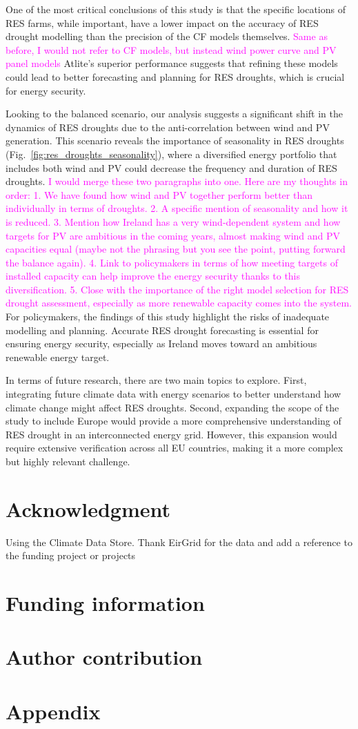 \documentclass[a4paper, 11pt]{article}
\begin{document}
One of the most critical conclusions of this study is that the specific locations of RES farms, while important, have a lower impact on the accuracy of RES drought modelling than the precision of the CF models themselves. \textcolor{magenta}{Same as before, I would not refer to CF models, but instead wind power curve and PV panel models} Atlite's superior performance suggests that refining these models could lead to better forecasting and planning for RES droughts, which is crucial for energy security.

Looking to the balanced scenario, our analysis suggests a significant shift in the dynamics of RES droughts due to the anti-correlation between wind and PV generation. This scenario reveals the importance of seasonality in RES droughts (Fig.~\ref{fig:res_droughts_seasonality}), where a diversified energy portfolio that includes both wind and PV could decrease the frequency and duration of RES droughts.
\textcolor{magenta}{I would merge these two paragraphs into one. Here are my thoughts in order: 1. We have found how wind and PV together perform better than individually in terms of droughts. 2. A specific mention of seasonality and how it is reduced. 3. Mention how Ireland has a very wind-dependent system and how targets for PV are ambitious in the coming years, almost making wind and PV capacities equal (maybe not the phrasing but you see the point, putting forward the balance again). 4. Link to policymakers in terms of how meeting targets of installed capacity can help improve the energy security thanks to this diversification. 5. Close with the importance of the right model selection for RES drought assessment, especially as more renewable capacity comes into the system.}
For policymakers, the findings of this study highlight the risks of inadequate modelling and planning. Accurate RES drought forecasting is essential for ensuring energy security, especially as Ireland moves toward an ambitious renewable energy target.

In terms of future research, there are two main topics to explore. First, integrating future climate data with energy scenarios to better understand how climate change might affect RES droughts. Second, expanding the scope of the study to include Europe would provide a more comprehensive understanding of RES drought in an interconnected energy grid. However, this expansion would require extensive verification across all EU countries, making it a more complex but highly relevant challenge.

\newpage
\section{Acknowledgment}
Using the Climate Data Store. Thank EirGrid for the data and add a reference to the funding project or projects

\section{Funding information}

\section{Author contribution}



\newpage
\section*{Appendix}
\end{document}
